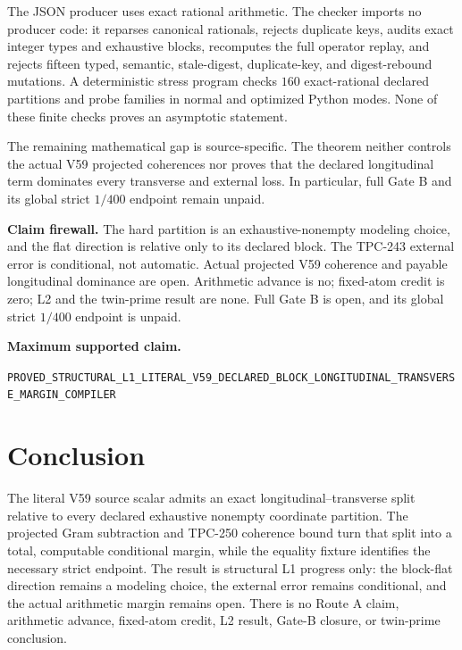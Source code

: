 \documentclass[10pt]{article}
\begin{document}
The JSON producer uses exact rational arithmetic.  The checker imports no
producer code: it reparses canonical rationals, rejects duplicate keys,
audits exact integer types and exhaustive blocks, recomputes the full operator
replay, and rejects fifteen typed, semantic, stale-digest, duplicate-key, and
digest-rebound mutations.  A deterministic stress program checks $160$
exact-rational declared partitions and probe families in normal and optimized
Python modes.  None of these finite checks proves an asymptotic statement.

The remaining mathematical gap is source-specific.  The theorem neither
controls the actual V59 projected coherences nor proves that the declared
longitudinal term dominates every transverse and external loss.  In
particular, full Gate B and its global strict $1/400$ endpoint remain unpaid.

\medskip
\noindent\textbf{Claim firewall.}
The hard partition is an exhaustive-nonempty modeling choice, and the flat
direction is relative only to its declared block.  The TPC-243 external error
is conditional, not automatic.  Actual projected V59 coherence and payable
longitudinal dominance are open.  Arithmetic advance is no; fixed-atom credit
is zero; L2 and the twin-prime result are none.  Full Gate B is open, and its
global strict $1/400$ endpoint is unpaid.

\medskip
\noindent\textbf{Maximum supported claim.}
\begin{center}
\small\nolinkurl{PROVED_STRUCTURAL_L1_LITERAL_V59_DECLARED_BLOCK_LONGITUDINAL_TRANSVERSE_MARGIN_COMPILER}
\end{center}

\section{Conclusion}

The literal V59 source scalar admits an exact longitudinal--transverse split
relative to every declared exhaustive nonempty coordinate partition.  The
projected Gram subtraction and TPC-250 coherence bound turn that split into a
total, computable conditional margin, while the equality fixture identifies
the necessary strict endpoint.  The result is structural L1 progress only:
the block-flat direction remains a modeling choice, the external error remains
conditional, and the actual arithmetic margin remains open.  There is no
Route A claim, arithmetic advance, fixed-atom credit, L2 result, Gate-B
closure, or twin-prime conclusion.



\end{document}
